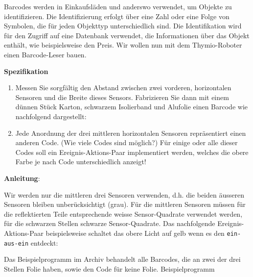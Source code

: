\label{ch.barcode}

Barcodes werden in Einkaufsläden und anderswo verwendet, um Objekte zu identifizieren. Die Identifizierung erfolgt über eine Zahl oder eine Folge von Symbolen, die für jeden Objekttyp unterschiedlich sind. Die Identifikation wird für den Zugriff auf eine Datenbank verwendet, die Informationen über das Objekt enthält, wie beispielsweise den Preis. Wir wollen nun mit dem Thymio-Roboter einen Barcode-Leser bauen.

\textbf{Spezifikation}

\begin{enumerate}
\item Messen Sie sorgfältig den Abstand zwischen zwei vorderen, horizontalen Sensoren und die Breite dieses Sensors. Fabrizieren Sie dann mit einem dünnen Stück Karton, schwarzem Isolierband und Alufolie einen Barcode wie nachfolgend dargestellt: 

\begin{center}
\end{center}

\item Jede Anordnung der drei mittleren horizontalen Sensoren repräsentiert einen anderen Code. (Wie viele Codes sind möglich?) Für einige oder alle dieser Codes soll ein Ereignis-Aktions-Paar implementiert werden, welches die obere Farbe je nach Code unterschiedlich anzeigt!

\end{enumerate}

\textbf{Anleitung}:

Wir werden nur die mittleren drei Sensoren verwenden, d.h. die beiden äusseren Sensoren bleiben unberücksichtigt (grau). Für die mittleren Sensoren müssen für die reflektierten Teile entsprechende weisse Sensor-Quadrate verwendet werden, für die schwarzen Stellen schwarze Sensor-Quadrate.
Das nachfolgende Ereignis-Aktions-Paar beispielsweise schaltet das obere Licht auf gelb wenn es den \texttt{ein-aus-ein} entdeckt:


Das Beispielprogramm im Archiv behandelt alle Barcodes, die an zwei der drei Stellen Folie haben, sowie den Code für keine Folie.
{\raggedleft \hfill Beispielprogramm }

